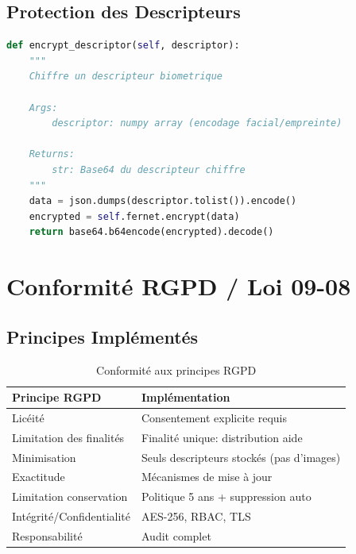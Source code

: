 \documentclass[12pt,a4paper]{report}
\begin{document}
\subsection{Protection des Descripteurs}

\begin{lstlisting}[caption={Chiffrement des descripteurs biométriques},language=Python]
def encrypt_descriptor(self, descriptor):
    """
    Chiffre un descripteur biometrique
    
    Args:
        descriptor: numpy array (encodage facial/empreinte)
    
    Returns:
        str: Base64 du descripteur chiffre
    """
    data = json.dumps(descriptor.tolist()).encode()
    encrypted = self.fernet.encrypt(data)
    return base64.b64encode(encrypted).decode()
\end{lstlisting}

\section{Conformité RGPD / Loi 09-08}

\subsection{Principes Implémentés}

\begin{table}[H]
    \centering
    \caption{Conformité aux principes RGPD}
    \label{tab:rgpd}
    \begin{tabular}{|l|p{8cm}|}
        \hline
        \textbf{Principe RGPD} & \textbf{Implémentation} \\
        \hline
        Licéité & Consentement explicite requis \\
        \hline
        Limitation des finalités & Finalité unique: distribution aide \\
        \hline
        Minimisation & Seuls descripteurs stockés (pas d'images) \\
        \hline
        Exactitude & Mécanismes de mise à jour \\
        \hline
        Limitation conservation & Politique 5 ans + suppression auto \\
        \hline
        Intégrité/Confidentialité & AES-256, RBAC, TLS \\
        \hline
        Responsabilité & Audit complet \\
        \hline
    \end{tabular}
\end{table}
\end{document}

